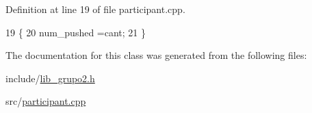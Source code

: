 Definition at line 19 of file participant.\+cpp.


\begin{DoxyCode}
19                                                 \{
20     num\_pushed =cant;
21 \}
\end{DoxyCode}


The documentation for this class was generated from the following files\+:\begin{DoxyCompactItemize}
\item 
include/\hyperlink{lib__grupo2_8h}{lib\+\_\+grupo2.\+h}\item 
src/\hyperlink{participant_8cpp}{participant.\+cpp}\end{DoxyCompactItemize}
